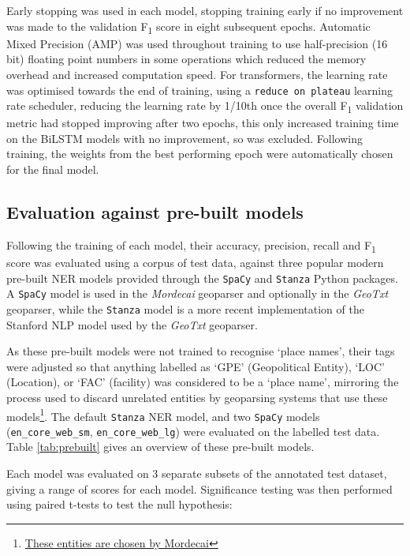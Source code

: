 \documentclass[]{interact}
\theoremstyle{plain}%
\theoremstyle{definition}
\theoremstyle{remark}
\begin{document}
Early stopping was used in each model, stopping training early if no
improvement was made to the validation F\textsubscript{1} score in eight
subsequent epochs. Automatic Mixed Precision (AMP) was used throughout
training to use half-precision (16 bit) floating point numbers in some
operations which reduced the memory overhead and increased computation
speed. For transformers, the learning rate was optimised towards the end
of training, using a \texttt{reduce\ on\ plateau} learning rate
scheduler, reducing the learning rate by 1/10th once the overall
F\textsubscript{1} validation metric had stopped improving after two
epochs, this only increased training time on the BiLSTM models with no
improvement, so was excluded. Following training, the weights from the
best performing epoch were automatically chosen for the final model.

\hypertarget{evaluation-against-pre-built-models}{%
\subsection{Evaluation against pre-built
models}\label{evaluation-against-pre-built-models}}

Following the training of each model, their accuracy, precision, recall
and F\textsubscript{1} score was evaluated using a corpus of test data,
against three popular modern pre-built NER models provided through the
\texttt{SpaCy} and \texttt{Stanza} Python packages. A \texttt{SpaCy}
model is used in the \emph{Mordecai} geoparser and optionally in the
\emph{GeoTxt} geoparser, while the \texttt{Stanza} model is a more
recent implementation of the Stanford NLP model used by the
\emph{GeoTxt} geoparser.

As these pre-built models were not trained to recognise `place names',
their tags were adjusted so that anything labelled as `GPE'
(Geopolitical Entity), `LOC' (Location), or `FAC' (facility) was
considered to be a `place name', mirroring the process used to discard
unrelated entities by geoparsing systems that use these
models\footnote{\href{https://github.com/openeventdata/mordecai/blob/9d37110f6cd1275852548fc53fd7a21bb77593f9/mordecai/geoparse.py\#L511}{These
  entities are chosen by Mordecai}}. The default \texttt{Stanza} NER
model, and two \texttt{SpaCy} models (\texttt{en\_core\_web\_sm},
\texttt{en\_core\_web\_lg}) were evaluated on the labelled test data.
Table \ref{tab:prebuilt} gives an overview of these pre-built models.

Each model was evaluated on 3 separate subsets of the annotated test
dataset, giving a range of scores for each model. Significance testing
was then performed using paired t-tests to test the null hypothesis:
\end{document}
